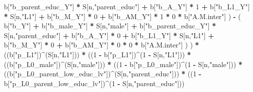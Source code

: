 \documentclass[
]{book}
\newenvironment{Shaded}{\begin{snugshade}}{\end{snugshade}}
\newcommand{\DecValTok}[1]{\textcolor[rgb]{0.00,0.00,0.81}{#1}}
\newcommand{\NormalTok}[1]{#1}
\newcommand{\SpecialCharTok}[1]{\textcolor[rgb]{0.81,0.36,0.00}{\textbf{#1}}}
\newcommand{\StringTok}[1]{\textcolor[rgb]{0.31,0.60,0.02}{#1}}
\begin{document}
\begin{Shaded}
\begin{Highlighting}[]
\NormalTok{                            b[}\StringTok{"b\_parent\_educ\_Y"}\NormalTok{] }\SpecialCharTok{*}\NormalTok{ S[n,}\StringTok{"parent\_educ"}\NormalTok{] }\SpecialCharTok{+} 
\NormalTok{                            b[}\StringTok{"b\_A\_Y"}\NormalTok{] }\SpecialCharTok{*} \DecValTok{1} \SpecialCharTok{+} 
\NormalTok{                            b[}\StringTok{"b\_L1\_Y"}\NormalTok{] }\SpecialCharTok{*}\NormalTok{ S[n,}\StringTok{"L1"}\NormalTok{] }\SpecialCharTok{+}
\NormalTok{                            b[}\StringTok{"b\_M\_Y"}\NormalTok{] }\SpecialCharTok{*} \DecValTok{0} \SpecialCharTok{+}
\NormalTok{                            b[}\StringTok{"b\_AM\_Y"}\NormalTok{] }\SpecialCharTok{*} \DecValTok{1} \SpecialCharTok{*} \DecValTok{0} \SpecialCharTok{*}\NormalTok{ b[}\StringTok{"A.M.inter"}\NormalTok{] ) }\SpecialCharTok{{-}} 
\NormalTok{                          ( b[}\StringTok{"b\_Y"}\NormalTok{] }\SpecialCharTok{+} 
\NormalTok{                              b[}\StringTok{"b\_male\_Y"}\NormalTok{] }\SpecialCharTok{*}\NormalTok{ S[n,}\StringTok{"male"}\NormalTok{] }\SpecialCharTok{+} 
\NormalTok{                              b[}\StringTok{"b\_parent\_educ\_Y"}\NormalTok{] }\SpecialCharTok{*}\NormalTok{ S[n,}\StringTok{"parent\_educ"}\NormalTok{] }\SpecialCharTok{+} 
\NormalTok{                              b[}\StringTok{"b\_A\_Y"}\NormalTok{] }\SpecialCharTok{*} \DecValTok{0} \SpecialCharTok{+} 
\NormalTok{                              b[}\StringTok{"b\_L1\_Y"}\NormalTok{] }\SpecialCharTok{*}\NormalTok{ S[n,}\StringTok{"L1"}\NormalTok{] }\SpecialCharTok{+}
\NormalTok{                              b[}\StringTok{"b\_M\_Y"}\NormalTok{] }\SpecialCharTok{*} \DecValTok{0} \SpecialCharTok{+}
\NormalTok{                              b[}\StringTok{"b\_AM\_Y"}\NormalTok{] }\SpecialCharTok{*} \DecValTok{0} \SpecialCharTok{*} \DecValTok{0} \SpecialCharTok{*}\NormalTok{ b[}\StringTok{"A.M.inter"}\NormalTok{] ) ) }\SpecialCharTok{*}
\NormalTok{      ((b[}\StringTok{"p\_L1"}\NormalTok{])}\SpecialCharTok{\^{}}\NormalTok{(S[n,}\StringTok{"L1"}\NormalTok{])) }\SpecialCharTok{*}
\NormalTok{      ((}\DecValTok{1} \SpecialCharTok{{-}}\NormalTok{ b[}\StringTok{"p\_L1"}\NormalTok{])}\SpecialCharTok{\^{}}\NormalTok{(}\DecValTok{1} \SpecialCharTok{{-}}\NormalTok{ S[n,}\StringTok{"L1"}\NormalTok{])) }\SpecialCharTok{*}
\NormalTok{      ((b[}\StringTok{"p\_L0\_male"}\NormalTok{])}\SpecialCharTok{\^{}}\NormalTok{(S[n,}\StringTok{"male"}\NormalTok{])) }\SpecialCharTok{*} 
\NormalTok{      ((}\DecValTok{1} \SpecialCharTok{{-}}\NormalTok{ b[}\StringTok{"p\_L0\_male"}\NormalTok{])}\SpecialCharTok{\^{}}\NormalTok{(}\DecValTok{1} \SpecialCharTok{{-}}\NormalTok{ S[n,}\StringTok{"male"}\NormalTok{])) }\SpecialCharTok{*} 
\NormalTok{      ((b[}\StringTok{"p\_L0\_parent\_low\_educ\_lv"}\NormalTok{])}\SpecialCharTok{\^{}}\NormalTok{(S[n,}\StringTok{"parent\_educ"}\NormalTok{])) }\SpecialCharTok{*}
\NormalTok{      ((}\DecValTok{1} \SpecialCharTok{{-}}\NormalTok{ b[}\StringTok{"p\_L0\_parent\_low\_educ\_lv"}\NormalTok{])}\SpecialCharTok{\^{}}\NormalTok{(}\DecValTok{1} \SpecialCharTok{{-}}\NormalTok{ S[n,}\StringTok{"parent\_educ"}\NormalTok{])) }
    

\end{Highlighting}
\end{Shaded}
\end{document}

